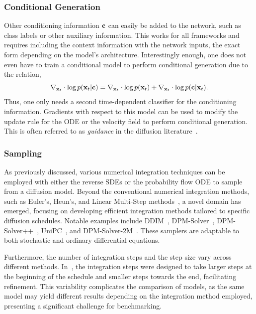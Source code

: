 \subsubsection{Conditional Generation}

Other conditioning information $\mathbf{c}$ can easily be added to the network, such as class labels or other auxiliary information.
This works for all frameworks and requires including the context information with the network inputs, the exact form depending on the model's architecture.
Interestingly enough, one does not even have to train a conditional model to perform conditional generation due to the relation,
\begin{equation}
    \label{eq:conditional_generation}
    \nabla_{\mathbf{x}_t} \cdot \log p(\mathbf{x}_t | \mathbf{c}) = \nabla_{\mathbf{x}_t} \cdot \log p(\mathbf{x}_t) + \nabla_{\mathbf{x}_t} \cdot \log p(\mathbf{c} | \mathbf{x}_t).
\end{equation}
Thus, one only needs a second time-dependent classifier for the conditioning information.
Gradients with respect to this model can be used to modify the update rule for the \Gls{ODE} or the velocity field to perform conditional generation.
This is often referred to as \textit{guidance} in the diffusion literature~\cite{DiffusionBeatsGANS}.

\subsubsection{Sampling}

As previously discussed, various numerical integration techniques can be employed with either the reverse \Glspl{SDE} or the probability flow \Gls{ODE} to sample from a diffusion model.
Beyond the conventional numerical integration methods, such as Euler's, Heun's, and Linear Multi-Step methods~\cite{heun}, a novel domain has emerged, focusing on developing efficient integration methods tailored to specific diffusion schedules.
Notable examples include DDIM~\cite{DDIM}, DPM-Solver~\cite{DPMSolverFastODE}, DPM-Solver++~\cite{DPMSolverFastSolver}, UniPC~\cite{UniPC}, and DPM-Solver-2M~\cite{DPMSolverFastSolver}.
These samplers are adaptable to both stochastic and ordinary differential equations.

Furthermore, the number of integration steps and the step size vary across different methods. In~\cite{ElucidatingDesignSpace}, the integration steps were designed to take larger steps at the beginning of the schedule and smaller steps towards the end, facilitating refinement. This variability complicates the comparison of models, as the same model may yield different results depending on the integration method employed, presenting a significant challenge for benchmarking.

